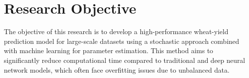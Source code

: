 \section*{Research Objective}
The objective of this research is to develop a high-performance wheat-yield prediction model for large-scale datasets using a stochastic approach combined with machine learning for parameter estimation. This method aims to significantly reduce computational time compared to traditional and deep neural network models, which often face overfitting issues due to unbalanced data.
